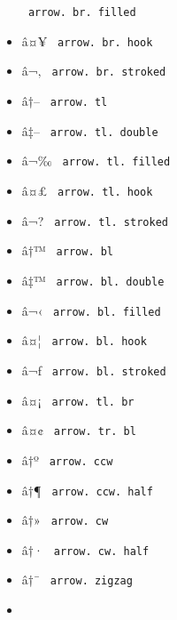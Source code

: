 \begin{itemize}
{  \texttt{\ arrow.\ br.\ filled\ }}
\item
  \label{symbol-arrow.br.hook}{{ â¤¥ }
  \texttt{\ arrow.\ br.\ hook\ }}
\item
  \label{symbol-arrow.br.stroked}{{ â¬‚ }
  \texttt{\ arrow.\ br.\ stroked\ }}
\item
  \label{symbol-arrow.tl}{{ â†-- }
  \texttt{\ arrow.\ tl\ }}
\item
  \label{symbol-arrow.tl.double}{{ â‡-- }
  \texttt{\ arrow.\ tl.\ double\ }}
\item
  \label{symbol-arrow.tl.filled}{{ â¬‰ }
  \texttt{\ arrow.\ tl.\ filled\ }}
\item
  \label{symbol-arrow.tl.hook}{{ â¤£ }
  \texttt{\ arrow.\ tl.\ hook\ }}
\item
  \label{symbol-arrow.tl.stroked}{{ â¬? }
  \texttt{\ arrow.\ tl.\ stroked\ }}
\item
  \label{symbol-arrow.bl}{{ â†™ }
  \texttt{\ arrow.\ bl\ }}
\item
  \label{symbol-arrow.bl.double}{{ â‡™ }
  \texttt{\ arrow.\ bl.\ double\ }}
\item
  \label{symbol-arrow.bl.filled}{{ â¬‹ }
  \texttt{\ arrow.\ bl.\ filled\ }}
\item
  \label{symbol-arrow.bl.hook}{{ â¤¦ }
  \texttt{\ arrow.\ bl.\ hook\ }}
\item
  \label{symbol-arrow.bl.stroked}{{ â¬ƒ }
  \texttt{\ arrow.\ bl.\ stroked\ }}
\item
  \label{symbol-arrow.tl.br}{{ â¤¡ }
  \texttt{\ arrow.\ tl.\ br\ }}
\item
  \label{symbol-arrow.tr.bl}{{ â¤¢ }
  \texttt{\ arrow.\ tr.\ bl\ }}
\item
  \label{symbol-arrow.ccw}{{ â†º }
  \texttt{\ arrow.\ ccw\ }}
\item
  \label{symbol-arrow.ccw.half}{{ â†¶ }
  \texttt{\ arrow.\ ccw.\ half\ }}
\item
  \label{symbol-arrow.cw}{{ â†» }
  \texttt{\ arrow.\ cw\ }}
\item
  \label{symbol-arrow.cw.half}{{ â†· }
  \texttt{\ arrow.\ cw.\ half\ }}
\item
  \label{symbol-arrow.zigzag}{{ â†¯ }
  \texttt{\ arrow.\ zigzag\ }}
\item

\end{itemize}
